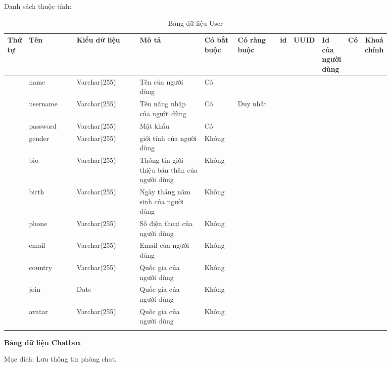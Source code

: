 \documentclass[../DoAn.tex]{subfiles}
\begin{document}
Danh sách thuộc tính:
\begin{longtable}[c]{
|>{\raggedright\arraybackslash}m{0.05\linewidth}
|>{\raggedright\arraybackslash}m{0.15\linewidth}
|>{\raggedright\arraybackslash}m{0.20\linewidth}
|>{\raggedright\arraybackslash}m{0.25\linewidth}
|>{\raggedright\arraybackslash}m{0.1\linewidth}
|>{\raggedright\arraybackslash}m{0.15\linewidth}|}
\hline
\textbf{Thứ tự} & \textbf{Tên} & \textbf{Kiểu dữ liệu} & \textbf{Mô tả} & \textbf{Có bắt buộc} & \textbf{Có ràng buộc} \hline
{} & id & UUID & Id của người dùng & Có & Khoá chính \\  & name & Varchar(255) & Tên của người dùng & Có & \\  & username & Varchar(255) & Tên năng nhập của người dùng & Có & Duy nhất \\  & password & Varchar(255) & Mật khẩu & Có & \\  & gender & Varchar(255) & giới tính của người dùng & Không & \\  & bio & Varchar(255) & Thông tin giới thiệu bản thân của người dùng & Không & \\  & birth & Varchar(255) & Ngày tháng năm sinh của người dùng & Không & \\  & phone & Varchar(255) & Số điện thoại của người dùng & Không & \\  & email & Varchar(255) & Email của người dùng & Không & \\  & country & Varchar(255) & Quốc gia của người dùng & Không &  \\  & join & Date & Quốc gia của người dùng & Không & \\  & avatar & Varchar(255) & Quốc gia của người dùng & Không & \\ \hline
\caption{Bảng dữ liệu User}
\label{tab:use_case_tổng_quan}
\end{longtable}


\newpage
\textbf{Bảng dữ liệu Chatbox}

Mục đích: Lưu thông tin phòng chat.
\end{document}

